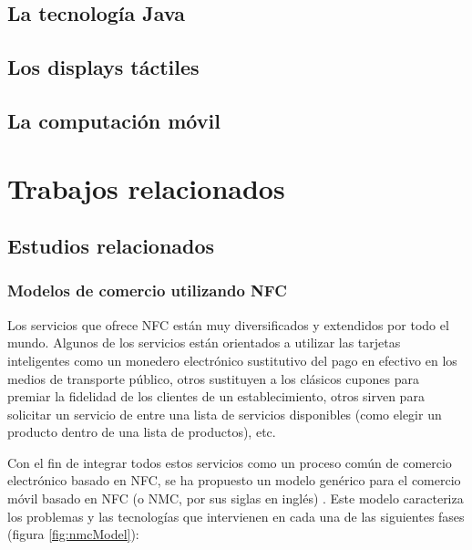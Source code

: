   \subsection{La tecnología Java}

  \subsection{Los displays táctiles}

  \subsection{La computación móvil}

\section{Trabajos relacionados}
  \subsection{Estudios relacionados}
  \label{subsec:related}
    \subsubsection{Modelos de comercio utilizando NFC}
  Los servicios que ofrece \acs{NFC} están muy diversificados y extendidos
  por todo el mundo. Algunos de los servicios están orientados a utilizar
  las tarjetas inteligentes como un monedero electrónico sustitutivo del
  pago en efectivo en los medios de transporte público, otros sustituyen
  a los clásicos cupones para premiar la fidelidad de los clientes de un
  establecimiento, otros sirven para solicitar un servicio de entre una
  lista de servicios disponibles (como elegir un producto dentro de una
  lista de productos), etc.

  Con el fin de integrar todos estos servicios como un proceso común de
  comercio electrónico basado en NFC, se ha propuesto un modelo genérico
  para el comercio móvil basado en \acs{NFC} (o \acs{NMC}, por sus siglas
  en inglés) \cite{bib:nfcCommerce}. Este modelo caracteriza los problemas y
  las tecnologías que intervienen en cada una de las siguientes fases
  (figura \ref{fig:nmcModel}):

